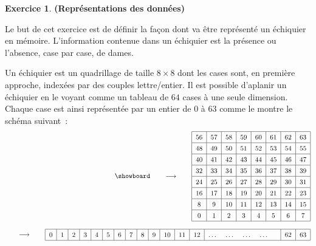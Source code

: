 \documentclass[12pt]{article}
\theoremstyle{definition}
\newtheorem{Exercice}{Exercice}
\begin{document}
\begin{Exercice} {\bf (Représentations des données)}\smallskip
\label{ex:representation}

Le but de cet exercice est de définir la façon dont va être représenté
un échiquier en mémoire. L'information contenue dans un échiquier est
la présence ou l'absence, case par case, de dames.
\smallskip

Un échiquier est un quadrillage de taille $8 \times 8$ dont les cases
sont, en première approche, indexées par des couples lettre/entier. Il
est possible d'\og aplanir \fg{} un échiquier en le voyant comme un
tableau de $64$ cases à une seule dimension. Chaque case est ainsi
représentée par un entier de $0$ à $63$ comme le montre le schéma suivant~:
\begin{equation*}\begin{split}
    \begin{split}\showboard\end{split}
    \qquad \longrightarrow \qquad
    \renewcommand{\arraystretch}{1.35}
    \begin{split}
    \begin{tabular}{|c|c|c|c|c|c|c|c|} \hline
        56 & 57 & 58 & 59 & 60 & 61 & 62 & 63 \\ \hline
        48 & 49 & 50 & 51 & 52 & 53 & 54 & 55 \\ \hline
        40 & 41 & 42 & 43 & 44 & 45 & 46 & 47 \\ \hline
        32 & 33 & 34 & 35 & 36 & 37 & 38 & 39 \\ \hline
        24 & 25 & 26 & 27 & 28 & 29 & 30 & 31 \\ \hline
        16 & 17 & 18 & 19 & 20 & 21 & 22 & 23 \\ \hline
        8 & 9 & 10 & 11 & 12 & 13 & 14 & 15 \\ \hline
        0 & 1 & 2 & 3 & 4 & 5 & 6 & 7 \\ \hline
    \end{tabular}
    \end{split} \\[.75em]
    \qquad \longrightarrow \qquad
    \begin{tabular}{|c|c|c|c|c|c|c|c|c|c|c|c|c|ccccc|c|c|} \hline
        0 & 1 & 2 & 3 & 4 & 5 & 6 & 7 & 8 & 9 & 10 & 11 & 12 &
        \dots & \dots & \dots & \dots & & 62 & 63 \\ \hline
    \end{tabular}
\end{split}\end{equation*}
\smallskip


\end{Exercice}
\end{document}
